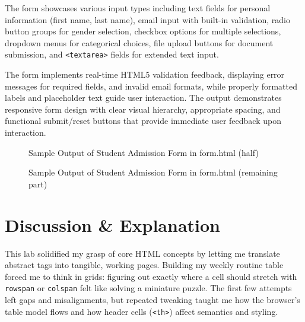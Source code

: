 \documentclass[twoside]{article}
\begin{document}
The form showcases various input types including text fields for personal information (first name, last name), email input with built-in validation, radio button groups for gender selection, checkbox options for multiple selections, dropdown menus for categorical choices, file upload buttons for document submission, and \texttt{<textarea>} fields for extended text input.

The form implements real-time HTML5 validation feedback, displaying error messages for required fields, and invalid email formats, while properly formatted labels and placeholder text guide user interaction. The output demonstrates responsive form design with clear visual hierarchy, appropriate spacing, and functional submit/reset buttons that provide immediate user feedback upon interaction.

\newpage
\begin{figure}[H]
    \centering
    \caption{Sample Output of Student Admission Form in form.html (half)}
\end{figure}

\begin{figure}[H]
    \centering
    \caption{Sample Output of Student Admission Form in form.html (remaining part)}
\end{figure}



\section{Discussion \& Explanation}

This lab solidified my grasp of core HTML concepts by letting me translate abstract tags into tangible, working pages. Building my weekly routine table forced me to think in grids: figuring out exactly where a cell should stretch with \texttt{rowspan} or \texttt{colspan} felt like solving a miniature puzzle. The first few attempts left gaps and misalignments, but repeated tweaking taught me how the browser’s table model flows and how header cells (\texttt{<th>}) affect semantics and styling.
\end{document}
